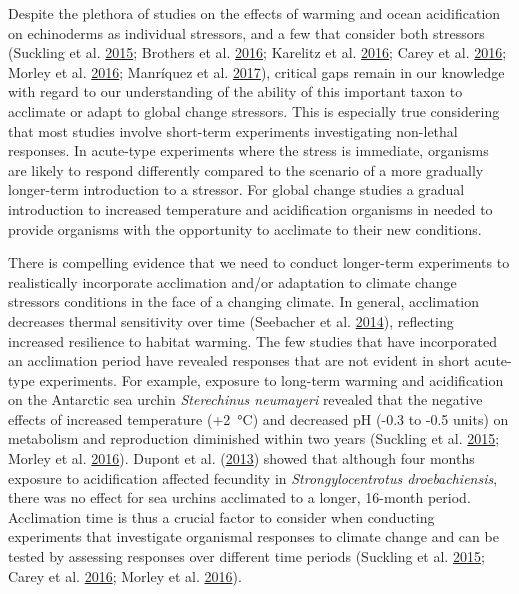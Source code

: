 \documentclass[a4paper,10pt, oneside]{memoir}
\begin{document}
Despite the plethora of studies on the effects of warming and ocean acidification on echinoderms as individual stressors, and a few that consider both stressors (Suckling et al. \protect\hyperlink{ref-Suckling2015}{2015}; Brothers et al. \protect\hyperlink{ref-Brothers2016}{2016}; Karelitz et al. \protect\hyperlink{ref-Karelitz2016}{2016}; Carey et al. \protect\hyperlink{ref-Carey2016}{2016}; Morley et al. \protect\hyperlink{ref-Morley2016}{2016}; Manríquez et al. \protect\hyperlink{ref-Manriquez2017}{2017}), critical gaps remain in our knowledge with regard to our understanding of the ability of this important taxon to acclimate or adapt to global change stressors.
This is especially true considering that most studies involve short-term experiments investigating non-lethal responses.
In acute-type experiments where the stress is immediate, organisms are likely to respond differently compared to the scenario of a more gradually longer-term introduction to a stressor.
For global change studies a gradual introduction to increased temperature and acidification organisms in needed to provide organisms with the opportunity to acclimate to their new conditions.

There is compelling evidence that we need to conduct longer-term experiments to realistically incorporate acclimation and/or adaptation to climate change stressors conditions in the face of a changing climate.
In general, acclimation decreases thermal sensitivity over time (Seebacher et al. \protect\hyperlink{ref-Seebacher2014}{2014}), reflecting increased resilience to habitat warming. The few studies that have incorporated an acclimation period have revealed responses that are not evident in short acute-type experiments.
For example, exposure to long-term warming and acidification on the Antarctic sea urchin \textit{Sterechinus neumayeri} revealed that the negative effects of increased temperature (+\SI{2}{\celsius}) and decreased pH (-0.3 to -0.5 units) on metabolism and reproduction diminished within two years (Suckling et al. \protect\hyperlink{ref-Suckling2015}{2015}; Morley et al. \protect\hyperlink{ref-Morley2016}{2016}).
Dupont et al. (\protect\hyperlink{ref-Dupont2013}{2013}) showed that although four months exposure to acidification affected fecundity in \textit{Strongylocentrotus droebachiensis}, there was no effect for sea urchins acclimated to a longer, 16-month period.
Acclimation time is thus a crucial factor to consider when conducting experiments that investigate organismal responses to climate change and can be tested by assessing responses over different time periods (Suckling et al. \protect\hyperlink{ref-Suckling2015}{2015}; Carey et al. \protect\hyperlink{ref-Carey2016}{2016}; Morley et al. \protect\hyperlink{ref-Morley2016}{2016}).
\end{document}
